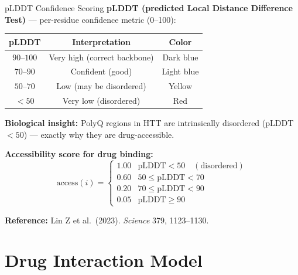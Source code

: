 \documentclass[aspectratio=169,11pt]{beamer}
\begin{document}
\begin{frame}{pLDDT Confidence Scoring}
    \textbf{pLDDT (predicted Local Distance Difference Test)} --- per-residue confidence metric (0--100):

    \begin{center}
        \begin{tabular}{c|c|c}
            \textbf{pLDDT} & \textbf{Interpretation} & \textbf{Color} \\ \hline
            $90$--$100$ & Very high (correct backbone) & \textcolor{htblue}{Dark blue} \\
            $70$--$90$  & Confident (good)             & \textcolor{htblue!50}{Light blue} \\
            $50$--$70$  & Low (may be disordered)      & \textcolor{htorange}{Yellow} \\
            $<50$       & Very low (disordered)        & \textcolor{htred}{Red}
        \end{tabular}
    \end{center}

    \textbf{Biological insight:} PolyQ regions in HTT are intrinsically disordered (pLDDT $<50$) --- exactly why they are drug-accessible.

    \textbf{Accessibility score for drug binding:}
    \[
    \text{access}(i) =
    \begin{cases}
        1.00 & \text{pLDDT} < 50 \quad (\text{disordered}) \\
        0.60 & 50 \le \text{pLDDT} < 70 \\
        0.20 & 70 \le \text{pLDDT} < 90 \\
        0.05 & \text{pLDDT} \ge 90
    \end{cases}
    \]

    \textbf{Reference:} Lin Z et al.\ (2023). \textit{Science} 379, 1123--1130.
\end{frame}

\section{Drug Interaction Model}
\end{document}
